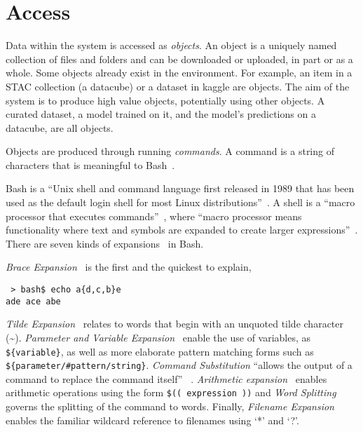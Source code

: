 \section{Access}

Data within the system is accessed as \emph{objects}. An object is a uniquely named collection of files and folders and can be downloaded or uploaded, in part or as a whole. Some objects already exist in the environment. For example, an item in a STAC collection (a datacube) or a dataset in kaggle are objects. The aim of the system is to produce high value objects, potentially using other objects. A curated dataset, a model trained on it, and the model's predictions on a datacube, are all objects.

Objects are produced through running \emph{commands}. A command is a string of characters that is meaningful to Bash~\cite{gnu_bash}. 

Bash is a \enquote{Unix shell and command language first released in 1989 that has been used as the default login shell for most Linux distributions}~\cite{bash}. A shell is a \enquote{macro processor that executes commands}~\cite{bash_manual}, where \enquote{macro processor means functionality where text and symbols are expanded to create larger expressions}~\cite{bash_manual}. There are seven kinds of expansions~\cite{bash_expansions_ref} in Bash.

\emph{Brace Expansion}~\cite{brace_expansion} is the first and the quickest to explain,
%
\begin{verbatim}
 > bash$ echo a{d,c,b}e
ade ace abe
\end{verbatim}
%
\emph{Tilde Expansion}~\cite{tilde_expansion} relates to words that begin with an unquoted tilde character (\textasciitilde). \emph{Parameter and Variable Expansion}~\cite{shell_parameter_expansion} enable the use of variables, as \texttt{\$\{variable\}}, as well as more elaborate pattern matching forms such as \texttt{\$\{parameter/\#pattern/string\}}. \emph{Command Substitution} \enquote{allows the output of a command to replace the command itself} ~\cite{command_substitution}. \emph{Arithmetic expansion}~\cite{arithmetic_expansion} enables arithmetic operations using the form \texttt{\$(( expression ))} and \emph{Word Splitting}~\cite{word_splitting} governs the splitting of the command to words. Finally, \emph{Filename Expansion}~\cite{filename_expansion} enables the familiar wildcard reference to filenames using `*' and `?'.

